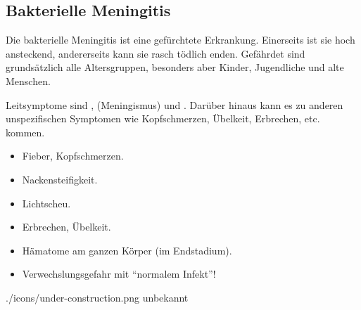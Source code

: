
\subsection{Bakterielle Meningitis}
\label{topic:meningitis}


Die bakterielle Meningitis ist eine gefürchtete Erkrankung. Einerseits ist sie
hoch ansteckend, andererseits kann sie rasch tödlich enden. Gefährdet sind
grundsätzlich alle Altersgruppen, besonders aber Kinder, Jugendliche und alte
Menschen.
 
 
{
Leitsymptome sind ,  (Meningismus) und
. Darüber hinaus kann es zu anderen unspezifischen
Symptomen wie Kopfschmerzen, Übelkeit, Erbrechen, etc. kommen. 



}{
\begin{itemize}
  \item Fieber, Kopfschmerzen.
  \item Nackensteifigkeit.
  \item Lichtscheu.
  \item Erbrechen, Übelkeit.
  \item Hämatome am ganzen Körper (im Endstadium).
  \item Verwechslungsgefahr mit "`normalem Infekt"'!
\end{itemize}

}{}{}{}

{

}{}
{./icons/under-construction.png}
{\label{fig:meningitis-baby}}
{unbekannt}





